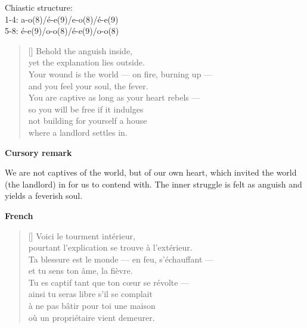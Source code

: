 \documentclass[a4paper,12pt,twoside,final]{book}
\begin{document}
\noindent Chiastic structure: \\
1-4: a-o(8)/é-e(9)/e-o(8)/é-e(9) \\
5-8: é-e(9)/o-o(8)/é-e(9)/o-o(8)

\newpage



\settowidth{\versewidth}{Your wound is the world --- on fire, burning up ---}

\begin{verse}[\versewidth]
  Behold the anguish inside, \\
  yet the explanation lies outside. \\
  Your wound is the world --- on fire, burning up --- \\
  and you feel your soul, the fever. \\
  You are captive as long as your heart rebels --- \\
  so you will be free if it indulges \\
  not building for yourself a house \\
  where a landlord settles in. \\
\end{verse}

\bigskip

\noindent \textbf{Cursory remark}

\medskip

We are not captives of the world, but of our own heart, which invited
the world (the landlord) in for us to contend with. The inner struggle
is felt as anguish and yields a feverish soul.

\bigskip

\noindent \textbf{French}


\settowidth{\versewidth}{Ta blessure est le monde --- en feu, s'échauffant ---}

\begin{verse}[\versewidth]
  Voici le tourment intérieur, \\
  pourtant l'explication se trouve à l'extérieur. \\
  Ta blessure est le monde --- en feu, s'échauffant --- \\
  et tu sens ton âme, la fièvre. \\
  Tu es captif tant que ton cœur se révolte --- \\
  ainsi tu seras libre s'il se complait \\
  à ne pas bâtir pour toi une maison \\
  où un propriétaire vient demeurer. \\
\end{verse}
\end{document}

